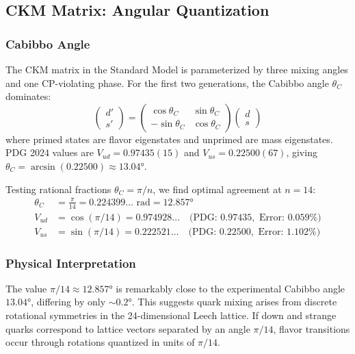 \documentclass[11pt,a4paper]{article}
\begin{document}
\subsection{CKM Matrix: Angular Quantization}

\subsubsection{Cabibbo Angle}

The CKM matrix in the Standard Model is parameterized by three mixing angles and one CP-violating phase. For the first two generations, the Cabibbo angle $\theta_C$ dominates:
\begin{equation}
\begin{pmatrix} d' \\ s' \end{pmatrix} = \begin{pmatrix} \cos \theta_C & \sin \theta_C \\ -\sin \theta_C & \cos \theta_C \end{pmatrix} \begin{pmatrix} d \\ s \end{pmatrix}
\end{equation}
where primed states are flavor eigenstates and unprimed are mass eigenstates. PDG 2024 values are $V_{ud} = 0.97435(15)$ and $V_{us} = 0.22500(67)$, giving $\theta_C = \arcsin(0.22500) \approx 13.04°$.

Testing rational fractions $\theta_C = \pi/n$, we find optimal agreement at $n = 14$:
\begin{align}
\theta_C &= \frac{\pi}{14} = 0.224399\ldots \text{ rad} = 12.857° \\
V_{ud} &= \cos(\pi/14) = 0.974928\ldots \quad \text{(PDG: } 0.97435, \text{ Error: } 0.059\%) \\
V_{us} &= \sin(\pi/14) = 0.222521\ldots \quad \text{(PDG: } 0.22500, \text{ Error: } 1.102\%)
\end{align}

\subsubsection{Physical Interpretation}

The value $\pi/14 \approx 12.857°$ is remarkably close to the experimental Cabibbo angle $13.04°$, differing by only $\sim 0.2°$. This suggests quark mixing arises from discrete rotational symmetries in the 24-dimensional Leech lattice. If down and strange quarks correspond to lattice vectors separated by an angle $\pi/14$, flavor transitions occur through rotations quantized in units of $\pi/14$.
\end{document}
